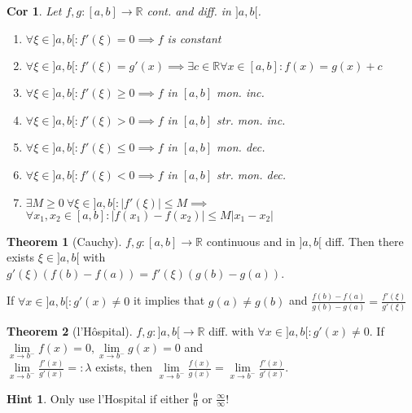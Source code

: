 \documentclass[a4paper, 10pt]{article}
\newtheorem*{corollary}{Cor}
\theoremstyle{definition}
\newtheorem*{note_wrapper}{Hint}
\theoremstyle{ex}
\theoremstyle{named}
\newtheorem*{ntheorem_wrapper}{Theorem}
\newenvironment{ntheorem}%
    {\begin{mdframed}[style=important]\begin{ntheorem_wrapper}}%
    {\end{ntheorem_wrapper}\end{mdframed}}
\newenvironment{note}%
    {\begin{mdframed}[style=trick]\begin{note_wrapper}}%
    {\end{note_wrapper}\end{mdframed}}
\newcommand{\R}{\mathbb{R}}
\begin{document}
\begin{corollary}
    Let $f, g: [a, b] \to \R$ cont. and diff. in $]a, b[$.
    \begin{enumerate}
        \item $\forall \xi \in ]a, b[: f'(\xi) = 0 \implies f$ is constant
        \item $\forall \xi \in ]a, b[: f'(\xi) = g'(x) \implies \exists c \in \R \forall x \in [a, b] : f(x) = g(x) + c$
        \item $\forall \xi \in ]a, b[: f'(\xi) \geq 0 \implies f$ in $[a, b]$ mon. inc.
        \item $\forall \xi \in ]a, b[: f'(\xi) > 0 \implies f$ in $[a, b]$ str. mon. inc.
        \item $\forall \xi \in ]a, b[: f'(\xi) \leq 0 \implies f$ in $[a, b]$ mon. dec.
        \item $\forall \xi \in ]a, b[: f'(\xi) < 0 \implies f$ in $[a, b]$ str. mon. dec.
        \item $\exists M \geq 0 \ \forall \xi \in ]a, b[ : |f'(\xi)| \leq M \implies$ \newline $\forall x_1, x_2 \in [a, b]: |f(x_1) - f(x_2)| \leq M |x_1 - x_2|$
    \end{enumerate}
\end{corollary}

\begin{ntheorem}[Cauchy]
    $f, g: [a, b] \to \R$ continuous and in $]a, b[$ diff. Then there exists $\xi \in ]a, b[$ with \\
    $g'(\xi)(f(b) - f(a)) = f'(\xi)(g(b) - g(a))$.

    If $\forall x \in ]a, b[ : g'(x) \neq 0$ it implies that $g(a) \neq g(b)$ and $\frac{f(b) - f(a)}{g(b) - g(a)} = \frac{f'(\xi)}{g'(\xi)}$
\end{ntheorem}

\begin{ntheorem}[l'Hôspital]
    $f,g : ]a, b[ \to \R$ diff. with $\forall x \in ]a, b[ : g'(x) \neq 0$.
    If $\lim\limits_{x \to b^-} f(x) = 0, \lim\limits_{x \to b^-} g(x) = 0$ and \\
    $\lim\limits_{x \to b^-} \frac{f'(x)}{g'(x)} =: \lambda$ exists, then $\lim\limits_{x \to b^-}\frac{f(x)}{g(x)} = \lim\limits_{x \to b^-}\frac{f'(x)}{g'(x)}$.
\end{ntheorem}

\begin{note}
    Only use l'Hospital if either $\frac{0}{0}$ or $\frac{\infty}{\infty}$!
\end{note}
\end{document}
